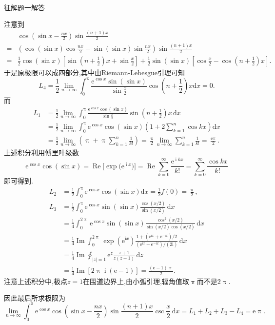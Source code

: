 \documentclass[UTF8,no-math,12pt,openany,table,dvipsnames,svgnames]{book}
\renewcommand{\pi}{\uppi}
\newcommand{\hei}{\CJKfamily{hei}}
\newenvironment{solve}{\par\indent{\hei 解}\hspace{1em}}{\par}
\renewcommand{\Im}{\operatorname{Im}}
\newcommand{\ii}{\;\!\mathrm i\;\!}
\begin{document}
\begin{MYBOX}[colbacktitle=green]{征解题一解答}
\begin{solve}
\qquad 注意到
\begin{align*}
{}&\cos \left( \sin x-\frac{nx}{2} \right) \sin \frac{\left( n+1 \right) x}{2}\\
=&\left( \cos \left( \sin x \right) \cos \frac{nx}{2}+\sin \left( \sin x \right) \sin \frac{nx}{2} \right) \sin \frac{\left( n+1 \right) x}{2}\\
=&\frac12\cos \left( \sin x \right) \left[ \sin \left( n+\frac{1}{2} \right) x+\sin \frac{x}{2} \right] +\frac12\sin \left( \sin x \right) \left[ \cos \frac{x}{2}-\cos \left( n+\frac{1}{2} \right) x \right].
\end{align*}
于是原极限可以成四部分,其中由Riemann-Lebesgue引理可知
\[
L_4=\frac12\lim_{n\rightarrow \infty} \int_0^{\pi}{\frac{\text{e}^{\cos x}\sin \left( \sin x \right)}{\sin \frac{x}{2}}\cos \left( n+\frac{1}{2} \right) x\text{d}x}=0.
\]
而
\begin{align*}
L_1&=\frac12\lim_{n\rightarrow \infty} \int_0^{\pi}{\frac{\text{e}^{\cos x}\cos \left( \sin x \right)}{\sin \frac{x}{2}}\sin \left( n+\frac{1}{2} \right) x\,\text{d}x}\\
&=\frac12\lim_{n\rightarrow \infty} \int_0^{\pi}{\text{e}^{\cos x}\cos \left( \sin x \right) \left( 1+2\sum_{k=1}^n{\cos kx} \right) \text{d}x}\\
&=\frac12\lim_{n\rightarrow \infty} \left( \pi +\pi \sum_{k=1}^n{\frac{1}{k!}} \right) =\frac\pi2 \lim_{n\rightarrow \infty} \sum_{k=1}^n{\frac{1}{k!}}=\frac{\text{e}\pi}2.
\end{align*}
上述积分利用傅里叶级数
\[\text{e}^{\cos x}\cos \left( \sin x \right) =\operatorname{Re}\bigl[\exp\bigl(\mathrm e^{\ii x}\bigr)\bigr]=\operatorname{Re}
\sum_{k=0}^\infty\frac{\mathrm e^{\ii kx}}{k!}=\sum_{k=0}^\infty\frac{\cos kx}{k!}\]
即可得到.
\begin{align*}
L_2&=\frac12\int_0^{\pi}{\text{e}^{\cos x}\cos \left( \sin x \right) \text{d}x}=\frac12f\left( 0 \right) =\frac\pi2,\\
L_3&=\frac12\int_0^{\pi}{\text{e}^{\cos x}\sin \left( \sin x \right) \frac{\cos \left( x/2 \right)}{\sin \left( x/2 \right)}\,\text{d}x}\\
&=\frac{1}{4}\int_0^{2\pi}{\text{e}^{\cos x}\sin \left( \sin x \right) \frac{\cos ^2\left( x/2 \right)}{\sin \left( x/2 \right) \cos \left( x/2 \right)}\,\text{d}x}\\
&=\frac{1}{4}\Im \int_0^{2\pi}{\exp \left( \text{e}^{\text{i}x} \right) \frac{1+\left( \text{e}^{\text{i}x}+\text{e}^{-\text{i}x} \right) /2}{\left( \text{e}^{\text{i}x}+\text{e}^{-\text{i}x} \right) /\left( \text{2i} \right)}\,\text{d}x}\\
&=\frac14\Im\oint_{|z|=1}\mathrm e^z\frac{z+1}{z(z-1)}\,\mathrm dz\\
&=\frac14\Im\left[2\pi\ii(\mathrm e-1)\right]=\frac{(\mathrm e-1)\pi}2.
\end{align*}
注意上述积分中,极点$z=1$在围道边界上,由小弧引理,辐角值取$\pi$而不是$2\pi$.
\end{solve}
\qquad 因此最后所求极限为
\[\lim_{n\to\infty}\int_0^\pi\mathrm e^{\cos x}\cos\left(\sin x-\frac{nx}2\right)\sin\frac{(n+1)x}2\csc\frac x2\,\mathrm dx=L_1+L_2+L_3-L_4=\mathrm e\pi.\]
\end{MYBOX}
\end{document}
